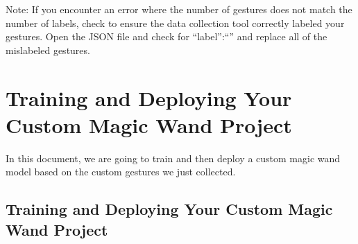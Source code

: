   Note: If you encounter an error where the number of gestures does not match the number of labels, check to ensure the data collection tool correctly labeled your gestures. Open the JSON file and check for “label”:“” and replace all of the mislabeled gestures.        
  
\section{Training and Deploying Your Custom Magic Wand Project}

In this document, we are going to train and then deploy a custom magic wand model based on the custom gestures we just collected.
    
\subsection{Training and Deploying Your Custom Magic Wand Project}

